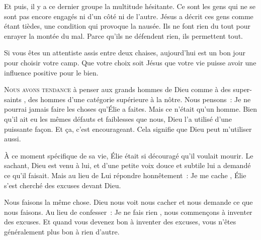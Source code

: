 
Et puis, il y a ce dernier groupe \ocadr la multitude hésitante.
 Ce sont les gens qui ne se sont pas encore engagés
 ni d'un côté ni de l'autre. Jésus a décrit ces gens comme étant tièdes,
 une condition qui provoque la nausée.
 Ils ne font rien du tout pour enrayer la montée du mal.
 Parce qu'ils ne défendent rien, ils permettent tout. 

Si vous êtes un attentiste assis entre deux chaises,
 aujourd'hui est un bon jour pour choisir votre camp.
 Que votre choix soit Jésus
 \ocadr que votre vie puisse avoir une influence positive pour le bien. 

\dvrule






\lettrine{N}{ous avons tendance} à penser aux grands hommes de Dieu
 comme à des \og super-saints \fg{},
 des hommes d'une catégorie supérieure à la nôtre. Nous pensons~:
 \og Je ne pourrai jamais faire les choses qu'Élie a faites. \fg{}
 Mais ce n'était qu'un homme. Bien qu'il ait eu les mêmes défauts
 et faiblesses que nous, Dieu l'a utilisé d'une puissante façon.
 Et ça, c'est encourageant. Cela signifie que Dieu peut m'utiliser aussi.

\`A ce moment spécifique de sa vie, Élie était si découragé
 qu'il voulait mourir. Le sachant, Dieu est venu à lui,
 et d'une petite voix douce et subtile lui a demandé ce qu'il faisait.
 Mais au lieu de Lui répondre honnêtement~: \og Je me cache \fg{},
 Élie s'est cherché des excuses devant Dieu. 

Nous faisons la même chose. Dieu nous voit nous cacher
 et nous demande ce que nous faisons.
 Au lieu de confesser~: \og Je ne fais rien \fg{},
 nous commençons à inventer des excuses.
 Et quand vous devenez bon à inventer des excuses,
 vous n'êtes généralement plus bon à rien d'autre. 

